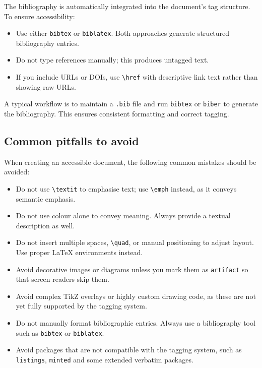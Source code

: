 The bibliography is automatically integrated into the document’s tag structure.
To ensure accessibility:

\begin{itemize}
	\item Use either \texttt{bibtex} or \texttt{biblatex}.  Both approaches
	generate structured bibliography entries.
	\item Do not type references manually; this produces untagged text.
	\item If you include URLs or DOIs, use \verb|\href| with descriptive link
	text rather than showing raw URLs.
\end{itemize}

A typical workflow is to maintain a \texttt{.bib} file and run
\texttt{bibtex} or \texttt{biber} to generate the bibliography.  This ensures
consistent formatting and correct tagging.

\subsection{Common pitfalls to avoid}

When creating an accessible document, the following common mistakes should be
avoided:

\begin{itemize}
	\item Do not use \verb|\textit| to emphasise text; use \verb|\emph| instead,
	as it conveys semantic emphasis.
	\item Do not use colour alone to convey meaning.  Always provide a textual
	description as well.
	\item Do not insert multiple spaces, \verb|\quad|, or manual positioning to
	adjust layout.  Use proper LaTeX environments instead.
	\item Avoid decorative images or diagrams unless you mark them as \verb|artifact| so
	that screen readers skip them.
	\item Avoid complex TikZ overlays or highly custom drawing code, as these are
	not yet fully supported by the tagging system.
	\item Do not manually format bibliographic entries.
	Always use a bibliography tool such as \texttt{bibtex} or
	\texttt{biblatex}.
	\item Avoid packages that are not compatible with the tagging system,
	such as \texttt{listings}, \texttt{minted} and some extended
	verbatim packages.
\end{itemize}

